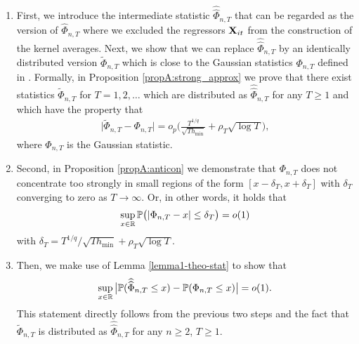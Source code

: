 \documentclass[a4paper,12pt]{article}
\makeatletter
\renewcommand{\eqref}[1]{\tagform@{\ref{#1}}}
\newcommand{\doublehattwo}[1]{\widehat{\widehat{#1}}}
\makeatother
\begin{document}
\begin{enumerate}
\item First, we introduce the intermediate statistic $\doublehattwo{\Phi}_{n, T}$ that can be regarded as the version of $\widehat{\Phi}_{n, T}$ where we excluded the regressors $\mathbf{X}_{it}$ from the construction of the kernel averages. Next, we show that we can replace $\doublehattwo{\Phi}_{n, T}$ by an identically distributed version $\widetilde{\Phi}_{n, T}$ which is close to the Gaussian statistics $\Phi_{n, T}$ defined in \eqref{eq:Phi}. Formally, in Proposition \ref{propA:strong_approx} we prove that there exist statistics $\widetilde{\Phi}_{n, T}$ for $T = 1,2,\ldots$ which are distributed as $\doublehattwo{\Phi}_{n, T}$ for any $T \ge 1$ and which have the property that 
\begin{align*}
\big| \widetilde{\Phi}_{n, T} - \Phi_{n,T} \big| = o_p \Big( \frac{T^{1/q}}{\sqrt{T h_{\min}}} + \rho_T\sqrt{\log T} \Big),
\end{align*}
where $\Phi_{n, T}$ is the Gaussian statistic.

\item Second, in Proposition \ref{propA:anticon} we demonstrate that $\Phi_{n,T}$ does not concentrate too strongly in small regions of the form $[x-\delta_T,x+\delta_T]$ with $\delta_T$ converging to zero as $T\to \infty$. Or, in other words, it holds that 
\begin{align*}
\sup_{x \in \mathbb{R}} \mathbb{P} \big( | \Phi_{n,T} - x | \le \delta_T \big) = o(1)
\end{align*}
with $\delta_T = T^{1/q} / \sqrt{T h_{\min}} + \rho_T \sqrt{\log T}$.
\item Then, we make use of Lemma \ref{lemma1-theo-stat} to show that
\begin{equation*}
\sup_{x \in \reals} \big| \pr(\doublehattwo{\Phi}_{n, T} \le x) - \pr(\Phi_{n,T} \le x) \big| = o(1). 
\end{equation*}
This statement directly follows from the previous two steps and the fact that $\widetilde{\Phi}_{n, T}$ is distributed as $\doublehattwo{\Phi}_{n, T}$ for any $n \ge 2$, $T \ge 1$.


\end{enumerate}
\end{document}

